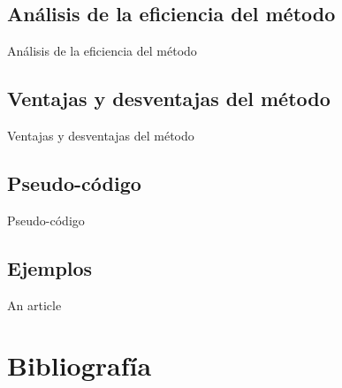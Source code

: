 \documentclass[journal,transmag]{IEEEtran}
\theoremstyle{mytheoremstyle}
\theoremstyle{mytheoremstyle}
\theoremstyle{myproblemstyle}
\begin{document}
\subsection{Análisis de la eficiencia del método}
\begin{lipsum}
    Análisis de la eficiencia del método
\end{lipsum}
\subsection{Ventajas y desventajas del método}
\begin{lipsum}
    Ventajas y desventajas del método
\end{lipsum}
\subsection{Pseudo-código}
\begin{lipsum}
    Pseudo-código
\end{lipsum}
\subsection{Ejemplos}
\begin{lipsum}
    An article \cite{anarticle}
\end{lipsum}
\newpage
\section{Bibliografía}


\end{document}

